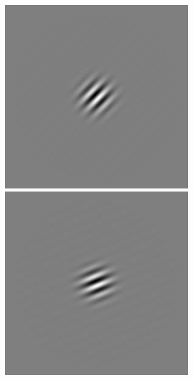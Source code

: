 \begin{figure}[ht]
\begin{center}
 \includegraphics[width=\columnwidth/9]{ch4/figures/rGabor3_2.jpg}
 \includegraphics[width=\columnwidth/9]{ch4/figures/rGabor3_3.jpg}

\end{center}
\end{figure}

